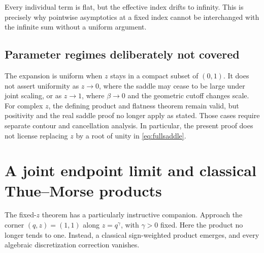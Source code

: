\documentclass[11pt,oneside]{article}
\numberwithin{equation}{section}
\theoremstyle{definition}
\theoremstyle{remark}
\begin{document}
Every individual term is flat, but the effective index drifts to infinity.
This is precisely why pointwise asymptotics at a fixed index cannot be
interchanged with the infinite sum without a uniform argument.

\subsection{Parameter regimes deliberately not covered}
The expansion is uniform when \(z\) stays in a compact subset of \((0,1)\).
It does not assert uniformity as \(z\to0\), where the saddle may cease to be
large under joint scaling, or as \(z\to1\), where \(\beta\to0\) and the
geometric cutoff changes scale. For complex \(z\), the defining product and
flatness theorem remain valid, but positivity and the real saddle proof no
longer apply as stated. Those cases require separate contour and cancellation
analysis. In particular, the present proof does not license replacing \(z\)
by a root of unity in \eqref{eq:fullsaddle}.

\section{A joint endpoint limit and classical Thue--Morse products}
\label{sec:boundarylayer}

The fixed-\(z\) theorem has a particularly instructive companion. Approach
the corner \((q,z)=(1,1)\) along \(z=q^\gamma\), with \(\gamma>0\) fixed.
Here the product no longer tends to one. Instead, a classical sign-weighted
product emerges, and every algebraic discretization correction vanishes.
\end{document}

